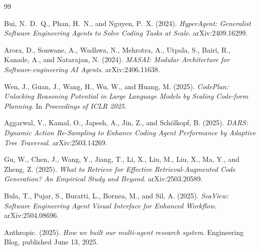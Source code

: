 \documentclass[11pt]{article}
\begin{document}
\begin{thebibliography}{99}

 Bui, N.~D.~Q., Phan, H.~N., and Nguyen, P.~X. (2024). \textit{HyperAgent: Generalist Software Engineering Agents to Solve Coding Tasks at Scale}. arXiv:2409.16299.

 Arora, D., Sonwane, A., Wadhwa, N., Mehrotra, A., Utpala, S., Bairi, R., Kanade, A., and Natarajan, N. (2024). \textit{MASAI: Modular Architecture for Software-engineering AI Agents}. arXiv:2406.11638.

 Wen, J., Guan, J., Wang, H., Wu, W., and Huang, M. (2025). \textit{CodePlan: Unlocking Reasoning Potential in Large Language Models by Scaling Code-form Planning}. In \textit{Proceedings of ICLR 2025}.

 Aggarwal, V., Kamal, O., Japesh, A., Jin, Z., and Schölkopf, B. (2025). \textit{DARS: Dynamic Action Re-Sampling to Enhance Coding Agent Performance by Adaptive Tree Traversal}. arXiv:2503.14269.

 Gu, W., Chen, J., Wang, Y., Jiang, T., Li, X., Liu, M., Liu, X., Ma, Y., and Zheng, Z. (2025). \textit{What to Retrieve for Effective Retrieval-Augmented Code Generation? An Empirical Study and Beyond}. arXiv:2503.20589.

 Bula, T., Pujar, S., Buratti, L., Bornea, M., and Sil, A. (2025). \textit{SeaView: Software Engineering Agent Visual Interface for Enhanced Workflow}. arXiv:2504.08696.

 Anthropic. (2025). \textit{How we built our multi-agent research system}. Engineering Blog, published June 13, 2025.

\end{thebibliography}
\end{document}
